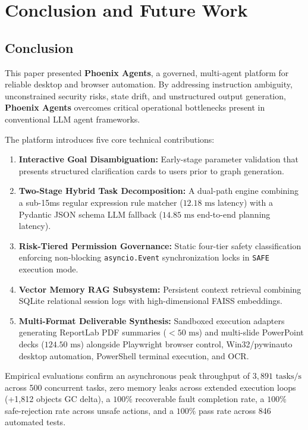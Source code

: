 \documentclass[conference]{IEEEtran}
\begin{document}
\section{Conclusion and Future Work}
\label{sec:conclusion}

\subsection{Conclusion}
This paper presented \textbf{Phoenix Agents}, a governed, multi-agent platform for reliable desktop and browser automation. By addressing instruction ambiguity, unconstrained security risks, state drift, and unstructured output generation, \textbf{Phoenix Agents} overcomes critical operational bottlenecks present in conventional LLM agent frameworks.

The platform introduces five core technical contributions:
\begin{enumerate}
    \item \textbf{Interactive Goal Disambiguation:} Early-stage parameter validation that presents structured clarification cards to users prior to graph generation.
    \item \textbf{Two-Stage Hybrid Task Decomposition:} A dual-path engine combining a sub-15ms regular expression rule matcher ($12.18\text{ ms}$ latency) with a Pydantic JSON schema LLM fallback ($14.85\text{ ms}$ end-to-end planning latency).
    \item \textbf{Risk-Tiered Permission Governance:} Static four-tier safety classification enforcing non-blocking \texttt{asyncio.Event} synchronization locks in \texttt{SAFE} execution mode.
    \item \textbf{Vector Memory RAG Subsystem:} Persistent context retrieval combining SQLite relational session logs with high-dimensional FAISS embeddings.
    \item \textbf{Multi-Format Deliverable Synthesis:} Sandboxed execution adapters generating ReportLab PDF summaries ($<50\text{ ms}$) and multi-slide PowerPoint decks ($124.50\text{ ms}$) alongside Playwright browser control, Win32/pywinauto desktop automation, PowerShell terminal execution, and OCR.
\end{enumerate}

Empirical evaluations confirm an asynchronous peak throughput of $3,891\text{ tasks/s}$ across 500 concurrent tasks, zero memory leaks across extended execution loops (+1,812 objects GC delta), a $100\%$ recoverable fault completion rate, a $100\%$ safe-rejection rate across unsafe actions, and a $100\%$ pass rate across 846 automated tests.
\end{document}

